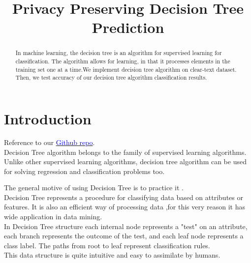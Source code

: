 \documentclass[conference,compsoc]{IEEEtran}
\begin{document}
\title{Privacy Preserving Decision Tree Prediction}

\author{
}

\maketitle
\tableofcontents

\newpage
\begin{abstract}
In machine learning, the decision tree is an algorithm for supervised learning for classification. The algorithm allows for learning, in that it processes elements in the training set one at a time.We implement decision tree algorithm on clear-text dataset. Then, we test accuracy of our decision tree algorithm classification results. \\

\end{abstract}


\section{Introduction}

Reference to our \href{https://github.com/assiakhateeb/PPML_lab/tree/main/\%20A}{\textcolor{blue}{Github repo}}.\\
Decision Tree algorithm belongs to the family of supervised learning algorithms. Unlike other supervised learning algorithms, decision tree algorithm can be used for solving regression and classification problems too.

The general motive of using Decision Tree is to practice it .\\
Decision Tree represents a procedure for classifying data based on attributes or features. It is also an efficient way of processing data ,for this very reason it has wide application in data mining.\\
In Decision Tree structure each internal node represents a "test" on an attribute, each branch represents the outcome of the test, and each leaf node represents a class label. The paths from root to leaf represent classification rules.\\
This data structure is quite intuitive and easy to assimilate by humans.
\end{document}
